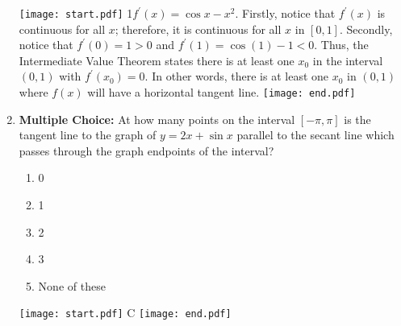 \documentclass[12pt]{article}
\begin{document}
\begin{enumerate}
\texttt{[image: start.pdf]}
{{{1\linewidth}{$f^{\prime}(x)=\cos{x}-x^2$.  Firstly, notice that $f^{\prime}(x)$ is continuous for all $x$; therefore, it is continuous for all $x$ in $[0,1]$.  Secondly, notice that $f^{\prime}(0)=1>0$ and $f^{\prime}(1)=\cos{(1)}-1<0$.  Thus, the Intermediate Value Theorem states there is at least one $x_0$ in the interval $(0,1)$ with $f^{\prime}(x_0)=0$.  In other words, there is at least one $x_0$ in $(0,1)$ where $f(x)$ will have a horizontal tangent line.}}}
\texttt{[image: end.pdf]}


\item {\bf Multiple Choice:} At how many points on the interval $[-\pi,\pi]$ is the tangent line to the graph of $y=2x+\sin{x}$ parallel to the secant line which passes through the graph endpoints of the interval?

\begin{enumerate}

\item 0

\item 1

\item 2

\item 3

\item None of these

\end{enumerate}

\texttt{[image: start.pdf]}
{{C}}
\texttt{[image: end.pdf]}



\end{enumerate}
\end{document}
